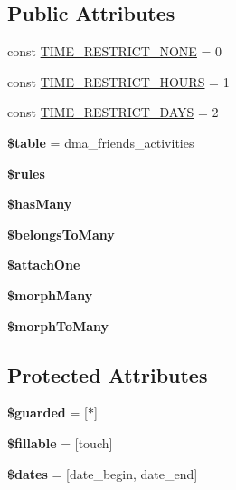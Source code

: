 \subsection*{Public Attributes}
\begin{DoxyCompactItemize}
\item 
const \hyperlink{classDMA_1_1Friends_1_1Models_1_1Activity_ab9dd8b18c4810beabdcf8e45039913c8}{T\+I\+M\+E\+\_\+\+R\+E\+S\+T\+R\+I\+C\+T\+\_\+\+N\+O\+N\+E} = 0
\item 
const \hyperlink{classDMA_1_1Friends_1_1Models_1_1Activity_ac78040e8784e02c2d1bcce5221ac6cb8}{T\+I\+M\+E\+\_\+\+R\+E\+S\+T\+R\+I\+C\+T\+\_\+\+H\+O\+U\+R\+S} = 1
\item 
const \hyperlink{classDMA_1_1Friends_1_1Models_1_1Activity_a71b85478f20cda144aeffe010364a0f7}{T\+I\+M\+E\+\_\+\+R\+E\+S\+T\+R\+I\+C\+T\+\_\+\+D\+A\+Y\+S} = 2
\item 
\hypertarget{classDMA_1_1Friends_1_1Models_1_1Activity_a2ded517047c73d831aef535c8adc6690}{}{\bfseries \$table} = \textquotesingle{}dma\+\_\+friends\+\_\+activities\textquotesingle{}\label{classDMA_1_1Friends_1_1Models_1_1Activity_a2ded517047c73d831aef535c8adc6690}

\item 
{\bfseries \$rules}
\item 
{\bfseries \$has\+Many}
\item 
{\bfseries \$belongs\+To\+Many}
\item 
{\bfseries \$attach\+One}
\item 
{\bfseries \$morph\+Many}
\item 
{\bfseries \$morph\+To\+Many}
\end{DoxyCompactItemize}
\subsection*{Protected Attributes}
\begin{DoxyCompactItemize}
\item 
\hypertarget{classDMA_1_1Friends_1_1Models_1_1Activity_ac82a10f722788b5c1c7a5295e1ac10c2}{}{\bfseries \$guarded} = \mbox{[}\textquotesingle{}$\ast$\textquotesingle{}\mbox{]}\label{classDMA_1_1Friends_1_1Models_1_1Activity_ac82a10f722788b5c1c7a5295e1ac10c2}

\item 
\hypertarget{classDMA_1_1Friends_1_1Models_1_1Activity_ab2a7401215dff9dfd8b600247b12454a}{}{\bfseries \$fillable} = \mbox{[}\textquotesingle{}touch\textquotesingle{}\mbox{]}\label{classDMA_1_1Friends_1_1Models_1_1Activity_ab2a7401215dff9dfd8b600247b12454a}

\item 
\hypertarget{classDMA_1_1Friends_1_1Models_1_1Activity_afe94503fbf177345e4bf0b1625dee499}{}{\bfseries \$dates} = \mbox{[}\textquotesingle{}date\+\_\+begin\textquotesingle{}, \textquotesingle{}date\+\_\+end\textquotesingle{}\mbox{]}\label{classDMA_1_1Friends_1_1Models_1_1Activity_afe94503fbf177345e4bf0b1625dee499}

\end{DoxyCompactItemize}


